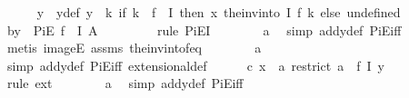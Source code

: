 \begin{isabellebody}
\ \ \ \ \isamarkupfalse%
\ y\ \ y{\isacharunderscore}{\kern0pt}def{\isacharcolon}{\kern0pt}\ {\isachardoublequoteopen}y\ {\isacharequal}{\kern0pt}\ {\isacharparenleft}{\kern0pt}{\isasymlambda}k{\isachardot}{\kern0pt}\ if\ k\ {\isasymin}\ f\ {\isacharbackquote}{\kern0pt}\ I\ then\ x\ {\isacharparenleft}{\kern0pt}the{\isacharunderscore}{\kern0pt}inv{\isacharunderscore}{\kern0pt}into\ I\ f\ k{\isacharparenright}{\kern0pt}\ else\ undefined{\isacharparenright}{\kern0pt}{\isachardoublequoteclose}\isanewline
\ \ \ \ \isamarkupfalse%
\ b{\isacharcolon}{\kern0pt}{\isachardoublequoteopen}y\ {\isasymin}\ PiE\ {\isacharparenleft}{\kern0pt}f\ {\isacharbackquote}{\kern0pt}\ I{\isacharparenright}{\kern0pt}\ A{\isachardoublequoteclose}\ \isanewline
\ \ \ \ \ \ \isamarkupfalse%
\ {\isacharparenleft}{\kern0pt}rule\ PiE{\isacharunderscore}{\kern0pt}I{\isacharparenright}{\kern0pt}\isanewline
\ \ \ \ \ \ \isamarkupfalse%
\ a\ \isamarkupfalse%
\ {\isacharparenleft}{\kern0pt}simp\ add{\isacharcolon}{\kern0pt}y{\isacharunderscore}{\kern0pt}def\ PiE{\isacharunderscore}{\kern0pt}iff{\isacharparenright}{\kern0pt}\isanewline
\ \ \ \ \ \ \ \isamarkupfalse%
\ {\isacharparenleft}{\kern0pt}metis\ imageE\ assms\ the{\isacharunderscore}{\kern0pt}inv{\isacharunderscore}{\kern0pt}into{\isacharunderscore}{\kern0pt}f{\isacharunderscore}{\kern0pt}eq{\isacharparenright}{\kern0pt}\isanewline
\ \ \ \ \ \ \isamarkupfalse%
\ a\ \isamarkupfalse%
\ {\isacharparenleft}{\kern0pt}simp\ add{\isacharcolon}{\kern0pt}y{\isacharunderscore}{\kern0pt}def\ PiE{\isacharunderscore}{\kern0pt}iff\ extensional{\isacharunderscore}{\kern0pt}def{\isacharparenright}{\kern0pt}\isanewline
\ \ \ \ \isamarkupfalse%
\ c{\isacharcolon}{\kern0pt}\ {\isachardoublequoteopen}x\ {\isacharequal}{\kern0pt}\ {\isacharparenleft}{\kern0pt}{\isasymlambda}a{\isachardot}{\kern0pt}\ restrict\ {\isacharparenleft}{\kern0pt}a\ {\isasymcirc}\ f{\isacharparenright}{\kern0pt}\ I{\isacharparenright}{\kern0pt}\ y{\isachardoublequoteclose}\ \isanewline
\ \ \ \ \ \ \isamarkupfalse%
\ {\isacharparenleft}{\kern0pt}rule\ ext{\isacharparenright}{\kern0pt}\isanewline
\ \ \ \ \ \ \isamarkupfalse%
\ a\ \isamarkupfalse%
\ {\isacharparenleft}{\kern0pt}simp\ add{\isacharcolon}{\kern0pt}y{\isacharunderscore}{\kern0pt}def\ PiE{\isacharunderscore}{\kern0pt}iff{\isacharparenright}{\kern0pt}\isanewline
\ \ \ \ \ \ \isamarkupfalse%

\end{isabellebody}
